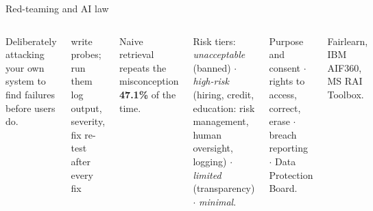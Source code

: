 \documentclass[aspectratio=169,11pt]{beamer}
\begin{document}
\begin{frame}{Red-teaming and AI law}
\begin{columns}[T]
\begin{bdef}
Deliberately attacking your own system to find failures before users do.
\end{bdef}
\begin{balgo}
\begin{algorithmic}[1]
  \State write probes; run them
  \State log output, severity, fix
\EndFor
\State re-test after every fix
\end{algorithmic}
\end{balgo}
\begin{bres}
Naive retrieval repeats the misconception \textbf{47.1\%} of the time.
\end{bres}
\begin{bdef}[EU AI Act]
Risk tiers: \emph{unacceptable} (banned) $\cdot$ \emph{high-risk} (hiring, credit, education: risk management, human oversight, logging) $\cdot$ \emph{limited} (transparency) $\cdot$ \emph{minimal}.
\end{bdef}
\begin{bdef}
Purpose and consent $\cdot$ rights to access, correct, erase $\cdot$ breach reporting $\cdot$ Data Protection Board.
\end{bdef}
\begin{bapp}
Fairlearn, IBM AIF360, MS RAI Toolbox.
\end{bapp}
\end{columns}
\end{frame}

\end{document}

